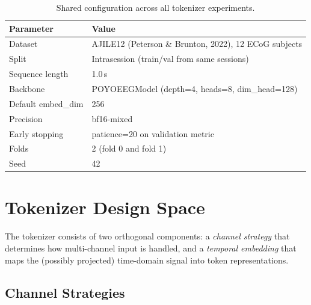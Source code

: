 \documentclass[11pt, a4paper]{article}
\begin{document}
\begin{table}[H]
      \centering
      \begin{tabular}{ll}
            \toprule
            \textbf{Parameter} & \textbf{Value}                                        \\
            \midrule
            Dataset            & AJILE12 (Peterson \& Brunton, 2022), 12 ECoG subjects \\
            Split              & Intrasession (train/val from same sessions)           \\
            Sequence length    & 1.0\,s                                                \\
            Backbone           & POYOEEGModel (depth=4, heads=8, dim\_head=128)        \\
            Default embed\_dim & 256                                                   \\
            Precision          & bf16-mixed                                            \\
            Early stopping     & patience=20 on validation metric                      \\
            Folds              & 2 (fold 0 and fold 1)                                 \\
            Seed               & 42                                                    \\
            \bottomrule
      \end{tabular}
      \caption{Shared configuration across all tokenizer experiments.}
      \label{tab:common-config}
\end{table}


\section{Tokenizer Design Space}
\label{sec:design-space}

The tokenizer consists of two orthogonal components: a \emph{channel
      strategy} that determines how multi-channel input is handled, and a
\emph{temporal embedding} that maps the (possibly projected) time-domain
signal into token representations.

\subsection{Channel Strategies}
\end{document}
